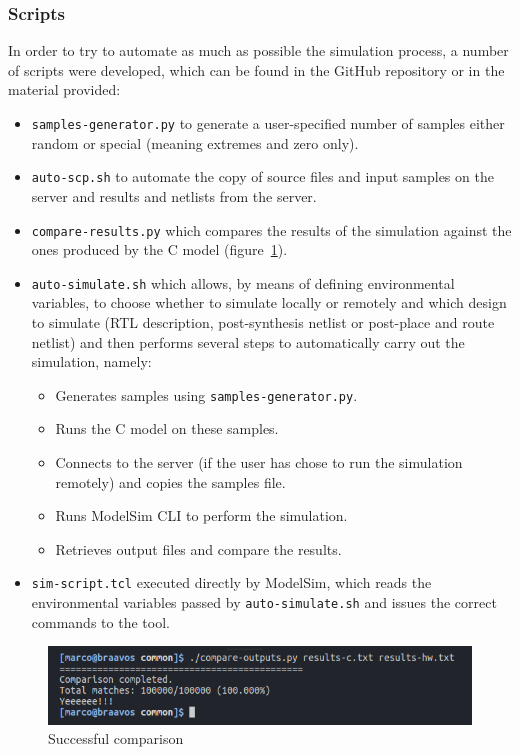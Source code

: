 \documentclass[a4paper]{article}
\begin{document}
\subsubsection{Scripts}
In order to try to automate as much as possible the simulation process, a number of scripts were developed, which can be found in the GitHub repository or in the material provided:
\begin{itemize}
    \item \texttt{samples-generator.py} to generate a user-specified number of samples either random or special (meaning extremes and zero only).
    \item \texttt{auto-scp.sh} to automate the copy of source files and input samples on the server and results and netlists from the server.
    \item \texttt{compare-results.py} which compares the results of the simulation against the ones produced by the C model (figure~\ref{fig:yeee}).
    \item \texttt{auto-simulate.sh} which allows, by means of defining environmental variables, to choose whether to simulate locally or remotely and which design to simulate (RTL description, post-synthesis netlist or post-place and route netlist) and then performs several steps to automatically carry out the simulation, namely:
    \begin{itemize}
        \item Generates samples using \texttt{samples-generator.py}.
        \item Runs the C model on these samples.
        \item Connects to the server (if the user has chose to run the simulation remotely) and copies the samples file.
        \item Runs ModelSim CLI to perform the simulation.
        \item Retrieves output files and compare the results.
    \end{itemize}
    \item \texttt{sim-script.tcl} executed directly by ModelSim, which reads the environmental variables passed by \texttt{auto-simulate.sh} and issues the correct commands to the tool.
\end{itemize}

\begin{figure}[hbtp]
    \centering
    \includegraphics[width=.8\linewidth]{media/2018-12-20-143134_627x116_scrot.png}
    \caption{Successful comparison}
    \label{fig:yeee}
\end{figure}
\end{document}
